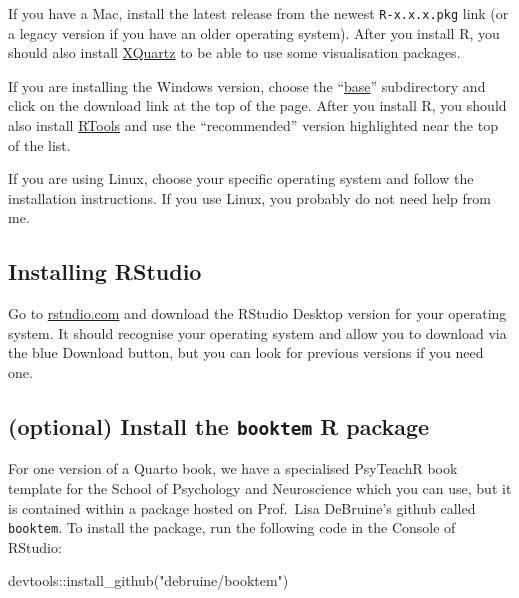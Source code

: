 \documentclass[
  letterpaper,
  DIV=11,
  numbers=noendperiod]{scrreprt}
\newenvironment{Shaded}{\begin{snugshade}}{\end{snugshade}}
\newcommand{\FunctionTok}[1]{\textcolor[rgb]{0.28,0.35,0.67}{#1}}
\newcommand{\NormalTok}[1]{\textcolor[rgb]{0.00,0.23,0.31}{#1}}
\newcommand{\SpecialCharTok}[1]{\textcolor[rgb]{0.37,0.37,0.37}{#1}}
\newcommand{\StringTok}[1]{\textcolor[rgb]{0.13,0.47,0.30}{#1}}
\begin{document}
If you have a Mac, install the latest release from the newest
\texttt{R-x.x.x.pkg} link (or a legacy version if you have an older
operating system). After you install R, you should also install
\href{http://xquartz.macosforge.org/}{XQuartz} to be able to use some
visualisation packages.

If you are installing the Windows version, choose the
``\href{https://cran.rstudio.com/bin/windows/base/}{base}'' subdirectory
and click on the download link at the top of the page. After you install
R, you should also install
\href{https://cran.rstudio.com/bin/windows/Rtools/}{RTools} and use the
``recommended'' version highlighted near the top of the list.

If you are using Linux, choose your specific operating system and follow
the installation instructions. If you use Linux, you probably do not
need help from me.

\subsection{Installing RStudio}\label{installing-rstudio}

Go to
\href{https://www.rstudio.com/products/rstudio/download/\#download}{rstudio.com}
and download the RStudio Desktop version for your operating system. It
should recognise your operating system and allow you to download via the
blue Download button, but you can look for previous versions if you need
one.

\subsection{\texorpdfstring{(optional) Install the \texttt{booktem} R
package}{(optional) Install the booktem R package}}\label{optional-install-the-booktem-r-package}

For one version of a Quarto book, we have a specialised PsyTeachR book
template for the School of Psychology and Neuroscience which you can
use, but it is contained within a package hosted on Prof.~Lisa
DeBruine's github called \texttt{booktem}. To install the package, run
the following code in the Console of RStudio:

\begin{Shaded}
\begin{Highlighting}[]
\NormalTok{devtools}\SpecialCharTok{::}\FunctionTok{install\_github}\NormalTok{(}\StringTok{"debruine/booktem"}\NormalTok{)}
\end{Highlighting}
\end{Shaded}
\end{document}
